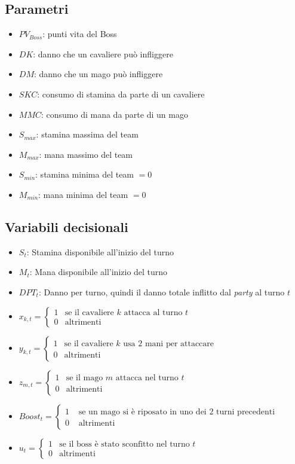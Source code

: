 \documentclass[12pt]{article}
\begin{document}
    \subsection{Parametri}
    \begin{itemize}
        \item $PV_{Boss}$: punti vita del Boss
        \item $DK$: danno che un cavaliere può infliggere
        \item $DM$: danno che un mago può infliggere
        \item $SKC$: consumo di stamina da parte di un cavaliere
        \item $MMC$: consumo di mana da parte di un mago
        \item $S_{max}$: stamina massima del team
        \item $M_{max}$: mana massimo del team
        \item $S_{min}$: stamina minima del team $=0$
        \item $M_{min}$: mana minima del team $=0$
    \end{itemize}
   \subsection{Variabili decisionali}
   \begin{itemize}
    \item $S_t$: Stamina disponibile all'inizio del turno
    \item $M_t$: Mana disponibile all'inizio del turno
    \item $DPT_t$: Danno per turno, quindi il danno totale inflitto dal \textit{party} al turno $t$
    \item $x_{k,t} = \begin{cases} 
        1 & \text{se il cavaliere } k \text{ attacca al turno } t \\ 
        0 & \text{altrimenti} 
    \end{cases}$
    \item $y_{k,t} = \begin{cases} 
        1 & \text{se il cavaliere } k \text{ usa 2 mani per attaccare } \\ 
        0 & \text{altrimenti} 
    \end{cases}$
    \item $z_{m,t} = \begin{cases} 
        1 & \text{se il mago } m \text{ attacca nel turno } t \\ 
        0 & \text{altrimenti} 
    \end{cases}$
    \item $Boost_t = \begin{cases}
        1 & \text{ se } \text{un mago si è riposato in uno dei 2 turni precedenti } \\
        0 & \text{ altrimenti }
    \end{cases}$
    \item $u_t = \begin{cases}
        1 & \text{se il boss è stato sconfitto nel turno } t \\
        0 & \text{altrimenti}
    \end{cases}$
    \end{itemize}
\end{document}
